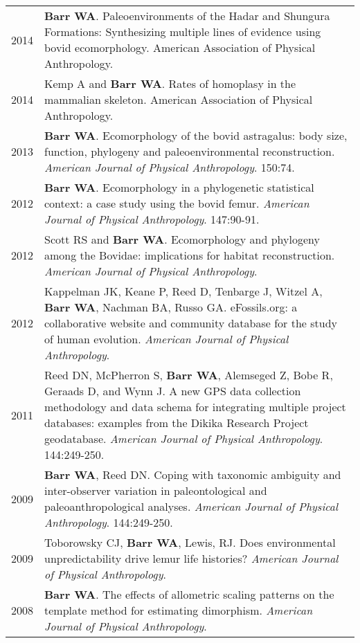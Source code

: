 \documentclass{article}
\begin{document}
\begin{longtable}{p{}p{}}
2014 & {\bfseries Barr WA}. Paleoenvironments of the Hadar and Shungura Formations: Synthesizing multiple lines of evidence using bovid ecomorphology. American Association of Physical Anthropology.\\[4pt]
2014 & Kemp A and {\bfseries Barr WA}. Rates of homoplasy in the mammalian skeleton. American Association of Physical Anthropology.\\[4pt]

2013 & {\bfseries Barr WA}. Ecomorphology of the bovid astragalus: body size, function, phylogeny and paleoenvironmental reconstruction. \emph{American Journal of Physical Anthropology}. 150:74.\\[4pt]

2012 & {\bfseries Barr WA}. Ecomorphology in a phylogenetic statistical context: a case study using the bovid femur. \emph{American Journal of Physical Anthropology}. 147:90-91.\\[4pt]

2012 & Scott RS and {\bfseries Barr WA}. Ecomorphology and phylogeny among the Bovidae: implications for habitat reconstruction. \emph{American Journal of Physical Anthropology}.\\[4pt]

2012 & Kappelman JK, Keane P, Reed D, Tenbarge J, Witzel A, {\bfseries Barr WA}, Nachman BA, Russo GA. eFossils.org: a collaborative website and community database for the study of human evolution. \emph{American Journal of Physical Anthropology}.\\[4pt]

2011 & Reed DN, McPherron S, {\bfseries Barr WA}, Alemseged Z, Bobe R, Geraads D, and Wynn J. A new GPS data collection methodology and data schema for integrating multiple project databases: examples from the Dikika Research Project geodatabase. \emph{American Journal of Physical Anthropology}. 144:249-250.\\[4pt]

2009 & {\bfseries Barr WA}, Reed DN. Coping with taxonomic ambiguity and inter-observer variation in paleontological and paleoanthropological analyses. \emph{American Journal of Physical Anthropology}. 144:249-250.\\[4pt]

2009 & Toborowsky CJ, {\bfseries Barr WA}, Lewis, RJ. Does environmental unpredictability drive lemur life histories? \emph{American Journal of Physical Anthropology}.\\[4pt]

2008 & {\bfseries Barr WA}. The effects of allometric scaling patterns on the template method for estimating dimorphism. \emph{American Journal of Physical Anthropology}.\\
\end{longtable}
\end{document}
